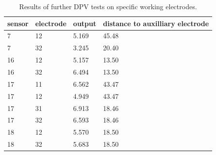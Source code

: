 \begin{table}
	\begin{tabular}{llll}
		sensor & electrode & output & distance to auxilliary electrode \\
		\hline
		7 & 12 & 5.169 & 45.48 \\
		7 & 32 & 3.245 & 20.40 \\
		16 & 12 & 5.157 & 13.50 \\
		16 & 32 & 6.494 & 13.50 \\
		17 & 11 & 6.562 & 43.47 \\
		17 & 12 & 4.949 & 43.47 \\
		17 & 31 & 6.913 & 18.46 \\
		17 & 32 & 6.593 & 18.46 \\
		18 & 12 & 5.570 & 18.50 \\
		18 & 32 & 5.683 & 18.50 \\
	\end{tabular}
	\caption{Results of further DPV tests on specific working electrodes.}
	\label{dpv-specific}
\end{table}

